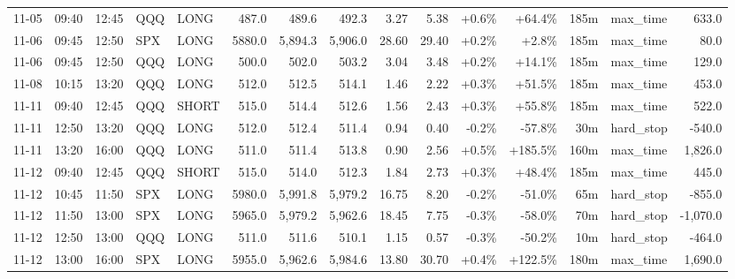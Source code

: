 \documentclass[11pt,a4paper,twoside]{article}
\begin{document}
\begin{landscape}
\begin{center}
\begin{longtable}{>{\color{txtmain}}l l l l l r r r r r r r r >{\color{txtmain}}l r}
11-05 & 09:40 & 12:45 & QQQ & LONG & 487.0 & 489.6 & 492.3 & 3.27 & 5.38 & \textcolor{wingreen}{+0.6\%} & \textcolor{wingreen}{+64.4\%} & 185m & max\_time & \textcolor{wingreen}{633.0} \\
11-06 & 09:45 & 12:50 & SPX & LONG & 5880.0 & 5,894.3 & 5,906.0 & 28.60 & 29.40 & \textcolor{wingreen}{+0.2\%} & \textcolor{wingreen}{+2.8\%} & 185m & max\_time & \textcolor{wingreen}{80.0} \\
11-06 & 09:45 & 12:50 & QQQ & LONG & 500.0 & 502.0 & 503.2 & 3.04 & 3.48 & \textcolor{wingreen}{+0.2\%} & \textcolor{wingreen}{+14.1\%} & 185m & max\_time & \textcolor{wingreen}{129.0} \\
11-08 & 10:15 & 13:20 & QQQ & LONG & 512.0 & 512.5 & 514.1 & 1.46 & 2.22 & \textcolor{wingreen}{+0.3\%} & \textcolor{wingreen}{+51.5\%} & 185m & max\_time & \textcolor{wingreen}{453.0} \\
11-11 & 09:40 & 12:45 & QQQ & SHORT & 515.0 & 514.4 & 512.6 & 1.56 & 2.43 & \textcolor{wingreen}{+0.3\%} & \textcolor{wingreen}{+55.8\%} & 185m & max\_time & \textcolor{wingreen}{522.0} \\
11-11 & 12:50 & 13:20 & QQQ & LONG & 512.0 & 512.4 & 511.4 & 0.94 & 0.40 & \textcolor{lossred}{-0.2\%} & \textcolor{lossred}{-57.8\%} & 30m & hard\_stop & \textcolor{lossred}{-540.0} \\
11-11 & 13:20 & 16:00 & QQQ & LONG & 511.0 & 511.4 & 513.8 & 0.90 & 2.56 & \textcolor{wingreen}{+0.5\%} & \textcolor{wingreen}{+185.5\%} & 160m & max\_time & \textcolor{wingreen}{1,826.0} \\
11-12 & 09:40 & 12:45 & QQQ & SHORT & 515.0 & 514.0 & 512.3 & 1.84 & 2.73 & \textcolor{wingreen}{+0.3\%} & \textcolor{wingreen}{+48.4\%} & 185m & max\_time & \textcolor{wingreen}{445.0} \\
11-12 & 10:45 & 11:50 & SPX & LONG & 5980.0 & 5,991.8 & 5,979.2 & 16.75 & 8.20 & \textcolor{lossred}{-0.2\%} & \textcolor{lossred}{-51.0\%} & 65m & hard\_stop & \textcolor{lossred}{-855.0} \\
11-12 & 11:50 & 13:00 & SPX & LONG & 5965.0 & 5,979.2 & 5,962.6 & 18.45 & 7.75 & \textcolor{lossred}{-0.3\%} & \textcolor{lossred}{-58.0\%} & 70m & hard\_stop & \textcolor{lossred}{-1,070.0} \\
11-12 & 12:50 & 13:00 & QQQ & LONG & 511.0 & 511.6 & 510.1 & 1.15 & 0.57 & \textcolor{lossred}{-0.3\%} & \textcolor{lossred}{-50.2\%} & 10m & hard\_stop & \textcolor{lossred}{-464.0} \\
11-12 & 13:00 & 16:00 & SPX & LONG & 5955.0 & 5,962.6 & 5,984.6 & 13.80 & 30.70 & \textcolor{wingreen}{+0.4\%} & \textcolor{wingreen}{+122.5\%} & 180m & max\_time & \textcolor{wingreen}{1,690.0} \\

\end{longtable}
\end{center}
\end{landscape}
\end{document}
